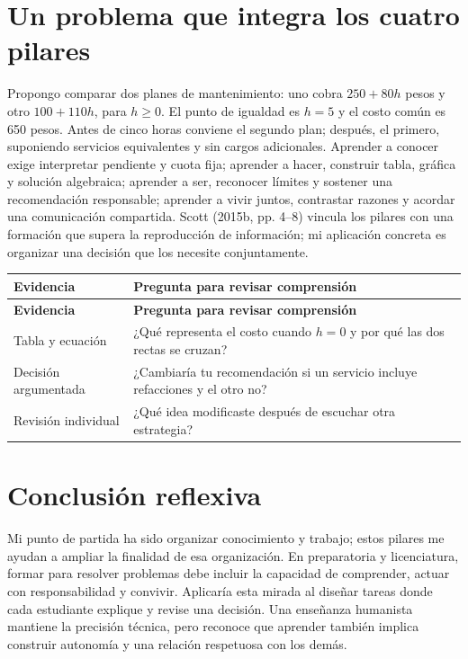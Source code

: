 \documentclass[spanish,letterpaper,oneside]{article}
\begin{document}
\section{Un problema que integra los cuatro pilares}
Propongo comparar dos planes de mantenimiento: uno cobra $250+80h$ pesos y otro $100+110h$, para $h\ge0$. El punto de igualdad es $h=5$ y el costo común es 650 pesos. Antes de cinco horas conviene el segundo plan; después, el primero, suponiendo servicios equivalentes y sin cargos adicionales.
Aprender a conocer exige interpretar pendiente y cuota fija; aprender a hacer, construir tabla, gráfica y solución algebraica; aprender a ser, reconocer límites y sostener una recomendación responsable; aprender a vivir juntos, contrastar razones y acordar una comunicación compartida. Scott (2015b, pp. 4--8) vincula los pilares con una formación que supera la reproducción de información; mi aplicación concreta es organizar una decisión que los necesite conjuntamente.

{\small{}\renewcommand{\arraystretch}{1.25}
\begin{longtable}{|>{\raggedright\arraybackslash}p{}|>{\raggedright\arraybackslash}p{}|}\hline
\rowcolor{iiiepePale} \textbf{Evidencia} & \textbf{Pregunta para revisar comprensión} \\\hline
\endfirsthead
\hline
\rowcolor{iiiepePale} \textbf{Evidencia} & \textbf{Pregunta para revisar comprensión} \\\hline
\endhead
Tabla y ecuación & ¿Qué representa el costo cuando $h=0$ y por qué las dos rectas se cruzan? \\\hline
Decisión argumentada & ¿Cambiaría tu recomendación si un servicio incluye refacciones y el otro no? \\\hline
Revisión individual & ¿Qué idea modificaste después de escuchar otra estrategia? \\\hline
\end{longtable}}

\section{Conclusión reflexiva}
Mi punto de partida ha sido organizar conocimiento y trabajo; estos pilares me ayudan a ampliar la finalidad de esa organización. En preparatoria y licenciatura, formar para resolver problemas debe incluir la capacidad de comprender, actuar con responsabilidad y convivir. Aplicaría esta mirada al diseñar tareas donde cada estudiante explique y revise una decisión. Una enseñanza humanista mantiene la precisión técnica, pero reconoce que aprender también implica construir autonomía y una relación respetuosa con los demás.
\end{document}
